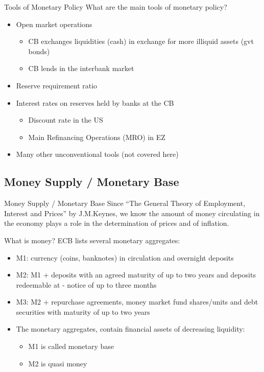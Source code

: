 \documentclass[
  ignorenonframetext,
  aspectratio=169,
]{beamer}
\providecommand{\tightlist}{%
  \setlength{\itemsep}{0pt}\setlength{\parskip}{0pt}}\usepackage{longtable,booktabs,array}
\begin{document}
\begin{frame}{Tools of Monetary Policy}
What are the main tools of monetary policy?

\begin{itemize}
\item
  Open market operations

  \begin{itemize}
  \tightlist
  \item
    CB exchanges liquidities (cash) in exchange for more illiquid assets
    (gvt bonds)
  \item
    CB lends in the interbank market
  \end{itemize}
\item
  Reserve requirement ratio
\item
  Interest rates on reserves held by banks at the CB

  \begin{itemize}
  \tightlist
  \item
    Discount rate in the US
  \item
    Main Refinancing Operations (MRO) in EZ
  \end{itemize}
\item
  Many other unconventional tools (not covered here)
\end{itemize}
\end{frame}

\subsection{Money Supply / Monetary
Base}\label{money-supply-monetary-base}

\begin{frame}{Money Supply / Monetary Base}
Since ``The General Theory of Employment, Interest and Prices'' by
J.M.Keynes, we know the amount of money circulating in the economy plays
a role in the determination of prices and of inflation.

What is money? ECB lists several monetary aggregates:

\begin{itemize}
\item
  M1: currency (coins, banknotes) in circulation and overnight deposits
\item
  M2: M1 + deposits with an agreed maturity of up to two years and
  deposits redeemable at - notice of up to three months
\item
  M3: M2 + repurchase agreements, money market fund shares/units and
  debt securities with maturity of up to two years
\item
  The monetary aggregates, contain financial assets of decreasing
  liquidity:

  \begin{itemize}
  \tightlist
  \item
    M1 is called monetary base
  \item
    M2 is quasi money
  \end{itemize}
\end{itemize}
\end{frame}
\end{document}
